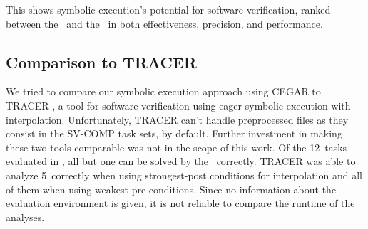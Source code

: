 This shows symbolic execution's potential for software verification, ranked between the \ and the \predicateCPA\ in both effectiveness, precision, and performance.

\subsection{Comparison to TRACER}
We tried to compare our symbolic execution approach using CEGAR to TRACER \cite{Jaffar2012a}, a tool for software verification using eager symbolic execution with interpolation.
Unfortunately, TRACER can't handle preprocessed files as they consist in the SV-COMP task sets, by default.
Further investment in making these two tools comparable was not in the scope of this work.
Of the 12~tasks evaluated in \cite{Jaffar2012a}, all but one can be solved by the \symbolicExecutionCPA\ correctly.
TRACER was able to analyze 5~correctly when using strongest-post conditions for interpolation and all of them when using weakest-pre conditions.
Since no information about the evaluation environment is given, it is not reliable to compare the runtime of the analyses.

